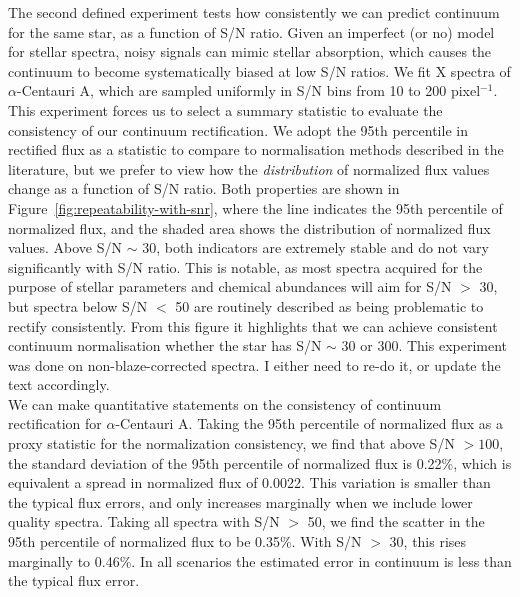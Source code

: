 \documentclass[modern]{aastex631}
\newcommand{\todo}[1]{\textcolor{tab:red}{#1}}
\begin{document}
The second defined experiment tests how consistently we can predict continuum for the same star, as a function of S/N ratio. Given an imperfect (or no) model for stellar spectra, noisy signals can mimic stellar absorption, which causes the continuum to become systematically biased at low S/N ratios. We fit \todo{X} spectra of $\alpha$-Centauri A, which are sampled uniformly in S/N bins from 10 to 200 pixel$^{-1}$. This experiment forces us to select a summary statistic to evaluate the consistency of our continuum rectification. We adopt the 95th percentile in rectified flux as a statistic to compare to normalisation methods described in the literature, but we prefer to view how the \emph{distribution} of normalized flux values change as a function of S/N ratio. Both properties are shown in Figure~\ref{fig:repeatability-with-snr}, where the line indicates the 95th percentile of normalized flux, and the shaded area shows the distribution of normalized flux values. Above S/N $\sim$ 30, both indicators are extremely stable and do not vary significantly with S/N ratio. This is notable, as most spectra acquired for the purpose of stellar parameters and chemical abundances will aim for S/N $>$ 30, but spectra below S/N $<$ 50 are routinely described as being problematic to rectify consistently. From this figure it highlights that we can achieve consistent continuum normalisation whether the star has S/N $\sim$ 30 or 300. \todo{This experiment was done on non-blaze-corrected spectra. I either need to re-do it, or update the text accordingly.}\\

We can make quantitative statements on the consistency of continuum rectification for $\alpha$-Centauri A. Taking the 95th percentile of normalized flux as a proxy statistic for the normalization consistency, we find that above S/N $> 100$, the standard deviation of the 95th percentile of normalized flux is 0.22\%, which is equivalent a spread in normalized flux of 0.0022. This variation is smaller than the typical flux errors, and only increases marginally when we include lower quality spectra. Taking all spectra with S/N $>$ 50, we find the scatter in the 95th percentile of normalized flux to be 0.35\%. With S/N $>$ 30, this rises marginally to 0.46\%. In all scenarios the estimated error in continuum is less than the typical flux error.\\


\end{document}

